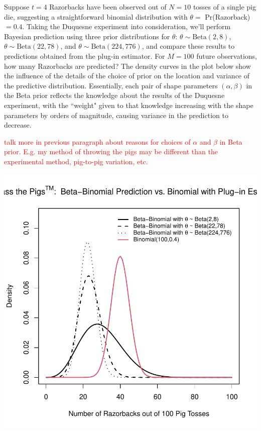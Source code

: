 \documentclass[12pt, a4paper]{article}
\begin{document}
  Suppose $t=4$ Razorbacks have been observed out of $N=10$ tosses of a single pig die, suggesting a straightforward binomial distribution with $\theta =$ Pr(Razorback) $= 0.4$. Taking the Duquesne experiment into consideration, we'll perform Bayesian prediction using three prior distributions for $\theta$: $\theta\sim\text{Beta}(2,8)$, $\theta\sim\text{Beta}(22,78)$, and $\theta\sim\text{Beta}(224,776)$, and compare these results to predictions obtained from the plug-in estimator.   For $M = 100$ future observations, how many Razorbacks are predicted?  The density curves in the plot below show the influence of the details of the choice of prior on the location and variance of the predictive distribution.  Essentially, each pair of shape parameters $(\alpha,\beta)$ in the Beta prior reflects the knowledge about the results of the Duquesne experiment, with the ``weight" given to that knowledge increasing with the shape parameters by orders of magnitude, causing variance in the prediction to decrease.

\textcolor{red}{talk more in previous paragraph about reasons for choices of $\alpha$ and $\beta$ in Beta prior.  E.g. my method of throwing the pigs may be different than the experimental method, pig-to-pig variation, etc.}


\includegraphics{Thesis-002}
\end{document}
